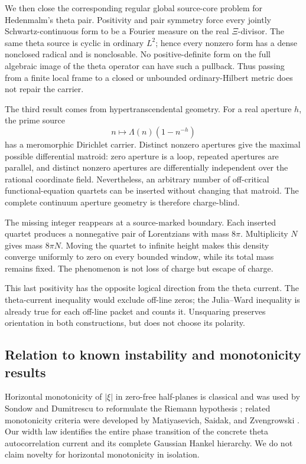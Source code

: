 \documentclass[11pt]{article}
\theoremstyle{definition}
\theoremstyle{remark}
\begin{document}
We then close the corresponding regular global source-core problem for
Hedenmalm's theta pair.  Positivity and pair symmetry force every
jointly Schwartz-continuous form to be a Fourier measure on the real
\(\Xi\)-divisor.  The same theta source is cyclic in ordinary \(L^2\);
hence every nonzero form has a dense nonclosed radical and is
nonclosable.  No positive-definite form on the full algebraic image of
the theta operator can have such a pullback.  Thus passing from a finite
local frame to a closed or unbounded ordinary-Hilbert metric does not
repair the carrier.

The third result comes from hypertranscendental geometry.  For a real
aperture \(h\), the prime source
\[
  n\longmapsto \Lambda(n)(1-n^{-h})
\]
has a meromorphic Dirichlet carrier.  Distinct nonzero apertures give the
maximal possible differential matroid: zero aperture is a loop, repeated
apertures are parallel, and distinct nonzero apertures are differentially
independent over the rational coordinate field.  Nevertheless, an arbitrary number of off-critical
functional-equation quartets can be inserted without changing that
matroid.  The complete continuum aperture geometry is therefore
charge-blind.

The missing integer reappears at a source-marked boundary.  Each inserted
quartet produces a nonnegative pair of Lorentzians with mass \(8\pi\).
Multiplicity \(N\) gives mass \(8\pi N\).  Moving the quartet to
infinite height makes this density converge uniformly to zero on every
bounded window, while its total mass remains fixed.  The phenomenon is
not loss of charge but escape of charge.

This last positivity has the opposite logical direction from the theta
current.  The theta-current inequality would exclude off-line zeros;
the Julia--Ward inequality is already true for each off-line packet and
counts it.  Unsquaring preserves orientation in both constructions, but
does not choose its polarity.

\subsection{Relation to known instability and monotonicity results}

Horizontal monotonicity of \(|\xi|\) in zero-free half-planes is
classical and was used by Sondow and Dumitrescu to reformulate the
Riemann hypothesis \cite{SondowDumitrescu2010}; related monotonicity
criteria were developed by Matiyasevich, Saidak, and Zvengrowski
\cite{MatiyasevichSaidakZvengrowski2014}.  Our width law identifies the
entire phase transition of the concrete theta autocorrelation current and
its complete Gaussian Hankel hierarchy.  We do not claim novelty for
horizontal monotonicity in isolation.
\end{document}
